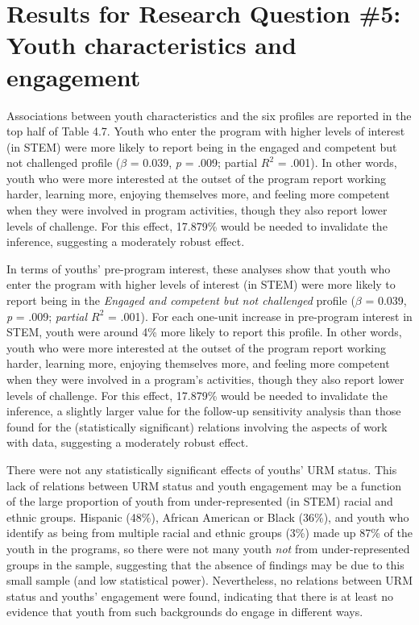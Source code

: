 \documentclass[]{msu-thesis}
\theoremstyle{definition}
\theoremstyle{definition}
\theoremstyle{definition}
\theoremstyle{remark}
\begin{document}
\section{Results for Research Question \#5: Youth characteristics and
engagement}\label{results-for-research-question-5-youth-characteristics-and-engagement}

Associations between youth characteristics and the six profiles are
reported in the top half of Table 4.7. Youth who enter the program with
higher levels of interest (in STEM) were more likely to report being in
the engaged and competent but not challenged profile (\(\beta\) = 0.039,
\emph{p} = .009; partial \(R^2\) = .001). In other words, youth who were
more interested at the outset of the program report working harder,
learning more, enjoying themselves more, and feeling more competent when
they were involved in program activities, though they also report lower
levels of challenge. For this effect, 17.879\% would be needed to
invalidate the inference, suggesting a moderately robust effect.

In terms of youths' pre-program interest, these analyses show that youth
who enter the program with higher levels of interest (in STEM) were more
likely to report being in the \emph{Engaged and competent but not
challenged} profile (\(\beta\) = 0.039, \emph{p} = .009; \emph{partial
\(R^2\)} = .001). For each one-unit increase in pre-program interest in
STEM, youth were around 4\% more likely to report this profile. In other
words, youth who were more interested at the outset of the program
report working harder, learning more, enjoying themselves more, and
feeling more competent when they were involved in a program's
activities, though they also report lower levels of challenge. For this
effect, 17.879\% would be needed to invalidate the inference, a slightly
larger value for the follow-up sensitivity analysis than those found for
the (statistically significant) relations involving the aspects of work
with data, suggesting a moderately robust effect.

There were not any statistically significant effects of youths' URM
status. This lack of relations between URM status and youth engagement
may be a function of the large proportion of youth from
under-represented (in STEM) racial and ethnic groups. Hispanic (48\%),
African American or Black (36\%), and youth who identify as being from
multiple racial and ethnic groups (3\%) made up 87\% of the youth in the
programs, so there were not many youth \emph{not} from under-represented
groups in the sample, suggesting that the absence of findings may be due
to this small sample (and low statistical power). Nevertheless, no
relations between URM status and youths' engagement were found,
indicating that there is at least no evidence that youth from such
backgrounds do engage in different ways.
\end{document}
